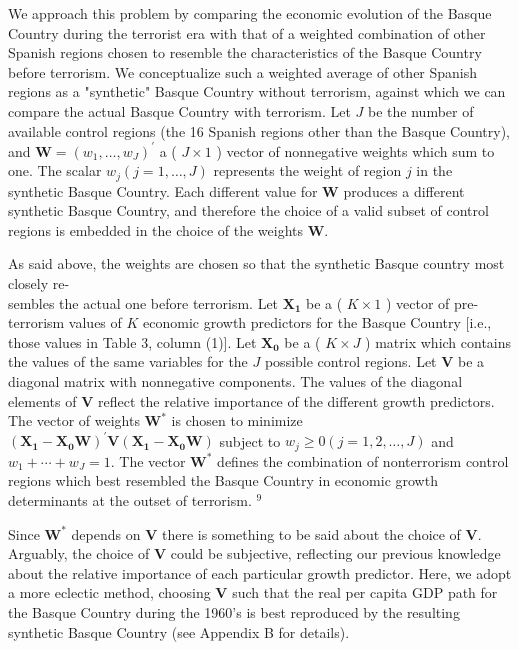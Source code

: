 \documentclass[10pt]{article}
\begin{document}
We approach this problem by comparing the economic evolution of the Basque Country during the terrorist era with that of a weighted combination of other Spanish regions chosen to resemble the characteristics of the Basque Country before terrorism. We conceptualize such a weighted average of other Spanish regions as a "synthetic" Basque Country without terrorism, against which we can compare the actual Basque Country with terrorism. Let $J$ be the number of available control regions (the 16 Spanish regions other than the Basque Country), and $\mathbf{W}=\left(w_{1}, \ldots, w_{J}\right)^{\prime}$ a ( $J \times 1$ ) vector of nonnegative weights which sum to one. The scalar $w_{j}(j=1, \ldots, J)$ represents the weight of region $j$ in the synthetic Basque Country. Each different value for $\mathbf{W}$ produces a different synthetic Basque Country, and therefore the choice of a valid subset of control regions is embedded in the choice of the weights $\mathbf{W}$.

As said above, the weights are chosen so that the synthetic Basque country most closely re-\\
sembles the actual one before terrorism. Let $\mathbf{X}_{\mathbf{1}}$ be a ( $K \times 1$ ) vector of pre-terrorism values of $K$ economic growth predictors for the Basque Country [i.e., those values in Table 3, column (1)]. Let $\mathbf{X}_{\mathbf{0}}$ be a ( $K \times J$ ) matrix which contains the values of the same variables for the $J$ possible control regions. Let $\mathbf{V}$ be a diagonal matrix with nonnegative components. The values of the diagonal elements of $\mathbf{V}$ reflect the relative importance of the different growth predictors. The vector of weights $\mathbf{W}^{*}$ is chosen to minimize $\left(\mathbf{X}_{\mathbf{1}}-\mathbf{X}_{\mathbf{0}} \mathbf{W}\right)^{\prime} \mathbf{V}\left(\mathbf{X}_{\mathbf{1}}-\mathbf{X}_{\mathbf{0}} \mathbf{W}\right)$ subject to $w_{j} \geq 0(j=1,2, \ldots, J)$ and $w_{1}+\cdots+w_{J}=1$. The vector $\mathbf{W}^{*}$ defines the combination of nonterrorism control regions which best resembled the Basque Country in economic growth determinants at the outset of terrorism. ${ }^{9}$

Since $\mathbf{W}^{*}$ depends on $\mathbf{V}$ there is something to be said about the choice of $\mathbf{V}$. Arguably, the choice of $\mathbf{V}$ could be subjective, reflecting our previous knowledge about the relative importance of each particular growth predictor. Here, we adopt a more eclectic method, choosing $\mathbf{V}$ such that the real per capita GDP path for the Basque Country during the 1960's is best reproduced by the resulting synthetic Basque Country (see Appendix B for details).
\end{document}
